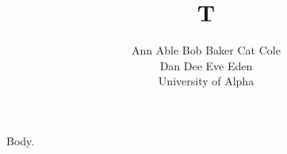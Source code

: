 \documentclass{article}
\begin{document}
\title{T}
\author{\parbox{\textwidth}{\centering Ann Able \quad Bob Baker \quad Cat Cole\\ Dan Dee \quad Eve Eden\\[1em] University of Alpha}}
\maketitle
Body.
\end{document}

